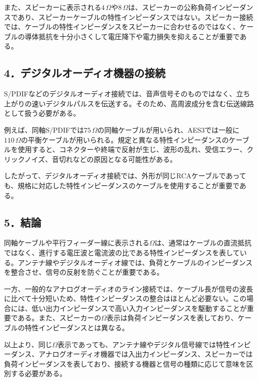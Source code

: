 \documentclass[platex,dvipdfmx,a4paper]{jsarticle}
\begin{document}
また、スピーカーに表示される$4\,\Omega$や$8\,\Omega$は、スピーカーの公称負荷インピーダンスであり、スピーカーケーブルの特性インピーダンスではない。スピーカー接続では、ケーブルの特性インピーダンスをスピーカーに合わせるのではなく、ケーブルの導体抵抗を十分小さくして電圧降下や電力損失を抑えることが重要である。

\subsection*{4．デジタルオーディオ機器の接続}

S/PDIFなどのデジタルオーディオ接続では、音声信号そのものではなく、立ち上がりの速いデジタルパルスを伝送する。そのため、高周波成分を含む伝送線路として扱う必要がある。

例えば、同軸S/PDIFでは$75\,\Omega$の同軸ケーブルが用いられ、AES3では一般に$110\,\Omega$の平衡ケーブルが用いられる。規定と異なる特性インピーダンスのケーブルを使用すると、コネクターや終端で反射が生じ、波形の乱れ、受信エラー、クリックノイズ、音切れなどの原因となる可能性がある。

したがって、デジタルオーディオ接続では、外形が同じRCAケーブルであっても、規格に対応した特性インピーダンスのケーブルを使用することが重要である。

\subsection*{5．結論}

同軸ケーブルや平行フィーダー線に表示される$\Omega$は、通常はケーブルの直流抵抗ではなく、進行する電圧波と電流波の比である特性インピーダンスを表している。アンテナ線やデジタルオーディオ線では、負荷とケーブルのインピーダンスを整合させ、信号の反射を防ぐことが重要である。

一方、一般的なアナログオーディオのライン接続では、ケーブル長が信号の波長に比べて十分短いため、特性インピーダンスの整合はほとんど必要ない。この場合には、低い出力インピーダンスで高い入力インピーダンスを駆動することが重要である。また、スピーカーの$\Omega$表示は負荷インピーダンスを表しており、ケーブルの特性インピーダンスとは異なる。

以上より、同じ$\Omega$表示であっても、アンテナ線やデジタル信号線では特性インピーダンス、アナログオーディオ機器では入出力インピーダンス、スピーカーでは負荷インピーダンスを表しており、接続する機器と信号の種類に応じて意味を区別する必要がある。
\end{document}
